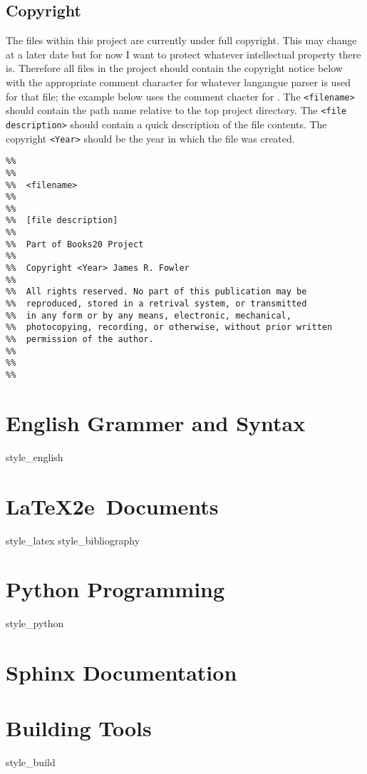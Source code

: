 \documentclass[twoside]{book}
\begin{document}
\section{Copyright}

The files within this project are currently under full copyright.  This
may change at a later date but for now I want to protect whatever
intellectual property there is.  Therefore all files in the project
should contain the copyright notice below with the appropriate comment
character for whatever langangue parser is used for that file; the
example below uses the comment chacter for \LaTeXe.  The
\texttt{<filename>} should contain the path name relative to the top
project directory. The \texttt{<file description>} should contain a
quick description of the file contents. The copyright \texttt{<Year>}
should be the year in which the file was created.

\begin{verbatim}
%%
%%
%%  <filename>
%%
%%  
%%  [file description]
%%
%%  Part of Books20 Project
%%
%%  Copyright <Year> James R. Fowler
%%
%%  All rights reserved. No part of this publication may be
%%  reproduced, stored in a retrival system, or transmitted
%%  in any form or by any means, electronic, mechanical,
%%  photocopying, recording, or otherwise, without prior written
%%  permission of the author.
%%
%%
%%
\end{verbatim}


\chapter{English Grammer and Syntax}
{style_english}

\chapter{\LaTeX2e\ Documents}
{style_latex}
{style_bibliography}

\chapter{Python Programming}
{style_python}

\chapter{Sphinx Documentation}

\chapter{Building Tools}
{style_build}

\printbibliography


\backmatter
\end{document}
